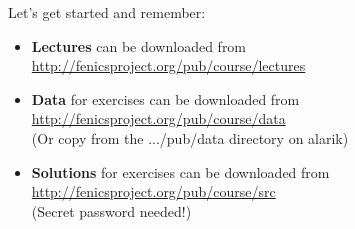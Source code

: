 \documentclass{fenicscourse}
\begin{document}









%

\begin{frame}{Let's get started and remember:}

\linespread{2.0}
\bigskip
\begin{itemize}
\item
{\footnotesize \textbf{Lectures} can be downloaded from
  \url{http://fenicsproject.org/pub/course/lectures}}

\item
{\footnotesize \textbf{Data} for exercises can be downloaded from
  \url{http://fenicsproject.org/pub/course/data} \\
(Or copy from the .../pub/data directory on alarik)}

\item
{\footnotesize \textbf{Solutions} for exercises can be downloaded from
  \url{http://fenicsproject.org/pub/course/src} \\
(Secret password needed!)
}
\end{itemize}
\linespread{1.0}\

\end{frame}
\end{document}
